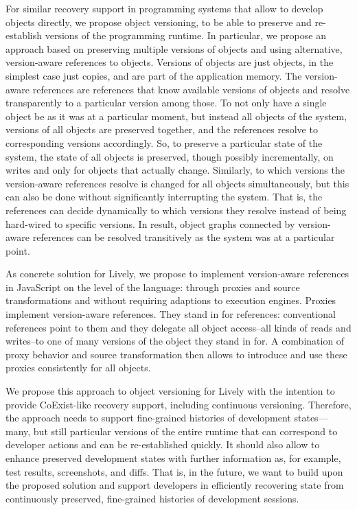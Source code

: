 For similar recovery support in programming systems that allow to develop objects directly, we propose object versioning, to be able to preserve and re-establish versions of the programming runtime.
In particular, we propose an approach based on preserving multiple versions of objects and using alternative, version-aware references to objects.
Versions of objects are just objects, in the simplest case just copies, and are part of the application memory.
The version-aware references are references that know available versions of objects and resolve transparently to a particular version among those.
To not only have a single object be as it was at a particular moment, but instead all objects of the system, versions of all objects are preserved together, and the references resolve to corresponding versions accordingly.
So, to preserve a particular state of the system, the state of all objects is preserved, though possibly incrementally, on writes and only for objects that actually change.
Similarly, to which versions the version-aware references resolve is changed for all objects simultaneously, but this can also be done without significantly interrupting the system.
That is, the references can decide dynamically to which versions they resolve instead of being hard-wired to specific versions.
In result, object graphs connected by version-aware references can be resolved transitively as the system was at a particular point.

As concrete solution for Lively, we propose to implement version-aware references in JavaScript on the level of the language: through proxies and source transformations and without requiring adaptions to execution engines.
Proxies implement version-aware references.
They stand in for references: conventional references point to them and they delegate all object access--all kinds of reads and writes--to one of many versions of the object they stand in for.
A combination of proxy behavior and source transformation then allows to introduce and use these proxies consistently for all objects.

We propose this approach to object versioning for Lively with the intention to provide CoExist-like recovery support, including continuous versioning.
Therefore, the approach needs to support fine-grained histories of development states---many, but still particular versions of the entire runtime that can correspond to developer actions and can be re-established quickly.
It should also allow to enhance preserved development states with further information as, for example, test results, screenshots, and diffs.
That is, in the future, we want to build upon the proposed solution and support developers in efficiently recovering state from continuously preserved, fine-grained histories of development sessions.\\

